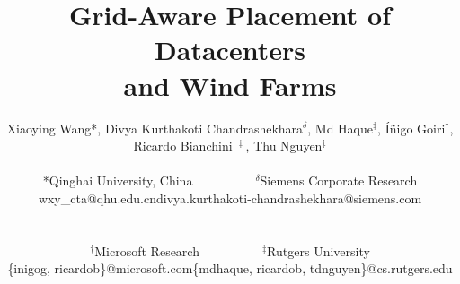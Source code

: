 \documentclass[conference]{IEEEtran}
\begin{document}
\title{Grid-Aware Placement of Datacenters\\and Wind Farms
\vspace{-0.5in}
}

%
 \author{
Xiaoying Wang*, Divya Kurthakoti Chandrashekhara$^\delta$, Md
Haque$^\ddag$, \'I\~{n}igo Goiri$^{\dag}$, Ricardo
Bianchini$^{\dag\ddag}$, Thu Nguyen$^\ddag$\\
[.075in]
\begin{tabular}{ccc}
  *Qinghai University, China & ~~~~~~~~~~ & $^\delta$Siemens Corporate Research \\
  wxy\_cta@qhu.edu.cn & & divya.kurthakoti-chandrashekhara@siemens.com \\
\end{tabular}\\
[0.075in]
\begin{tabular}{ccc}
    $^\dag$Microsoft Research & ~~~~~~~~~~ & $^\ddag$Rutgers University \\
    \{inigog, ricardob\}@microsoft.com & & \{mdhaque, ricardob, tdnguyen\}@cs.rutgers.edu\\
\end{tabular}
 }



\date{}

\maketitle












\end{document}
